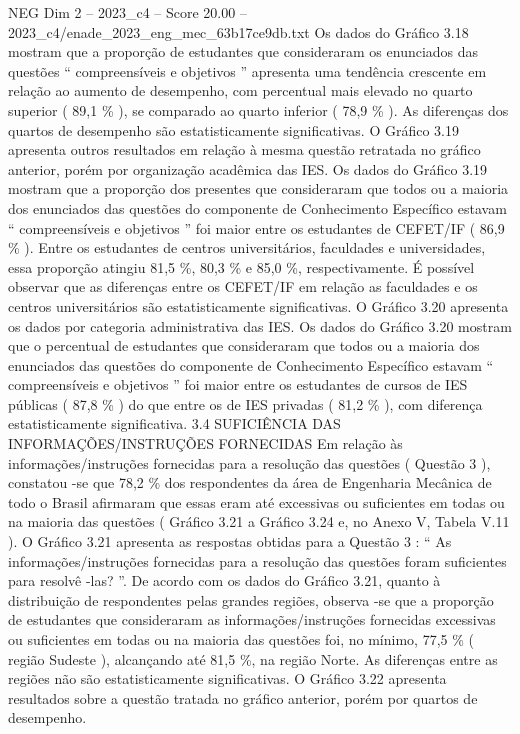 \begin{textsample}{NEG Dim 2 – 2023\_c4 – Score 20.00 – 2023\_c4/enade\_2023\_eng\_mec\_63b17ce9db.txt}
Os dados do Gráfico 3.18 mostram que a proporção de estudantes que consideraram os enunciados das questões “ compreensíveis e objetivos ” apresenta uma tendência crescente em relação ao aumento de desempenho, com percentual mais elevado no quarto superior ( 89,1 \% ), se comparado ao quarto inferior ( 78,9 \% ).
As diferenças dos quartos de desempenho são estatisticamente significativas.
O Gráfico 3.19 apresenta outros resultados em relação à mesma questão retratada no gráfico anterior, porém por organização acadêmica das IES.
Os dados do Gráfico 3.19 mostram que a proporção dos presentes que consideraram que todos ou a maioria dos enunciados das questões do componente de Conhecimento Específico estavam “ compreensíveis e objetivos ” foi maior entre os estudantes de CEFET/IF ( 86,9 \% ).
Entre os estudantes de centros universitários, faculdades e universidades, essa proporção atingiu 81,5 \%, 80,3 \% e 85,0 \%, respectivamente.
É possível observar que as diferenças entre os CEFET/IF em relação as faculdades e os centros universitários são estatisticamente significativas.
O Gráfico 3.20 apresenta os dados por categoria administrativa das IES.
Os dados do Gráfico 3.20 mostram que o percentual de estudantes que consideraram que todos ou a maioria dos enunciados das questões do componente de Conhecimento Específico estavam “ compreensíveis e objetivos ” foi maior entre os estudantes de cursos de IES públicas ( 87,8 \% ) do que entre os de IES privadas ( 81,2 \% ), com diferença estatisticamente significativa. 3.4 SUFICIÊNCIA DAS INFORMAÇÕES/INSTRUÇÕES FORNECIDAS Em relação às informações/instruções fornecidas para a resolução das questões ( Questão 3 ), constatou -se que 78,2 \% dos respondentes da área de Engenharia Mecânica de todo o Brasil afirmaram que essas eram até excessivas ou suficientes em todas ou na maioria das questões ( Gráfico 3.21 a Gráfico 3.24 e, no Anexo V, Tabela V.11 ).
O Gráfico 3.21 apresenta as respostas obtidas para a Questão 3 : “ As informações/instruções fornecidas para a resolução das questões foram suficientes para resolvê -las? ”.
De acordo com os dados do Gráfico 3.21, quanto à distribuição de respondentes pelas grandes regiões, observa -se que a proporção de estudantes que consideraram as informações/instruções fornecidas excessivas ou suficientes em todas ou na maioria das questões foi, no mínimo, 77,5 \% ( região Sudeste ), alcançando até 81,5 \%, na região Norte.
As diferenças entre as regiões não são estatisticamente significativas.
O Gráfico 3.22 apresenta resultados sobre a questão tratada no gráfico anterior, porém por quartos de desempenho.

\end{textsample}
